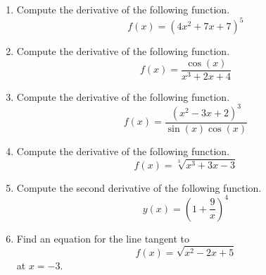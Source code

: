 \documentclass{article}
\begin{document}
\ActivityTitle[class=Calculus I, number=4, name=Differentiation II (Solutions)]

\begin{enumerate}
\item Compute the derivative of the following function. \[ f(x) = (4 x^2 + 7 x + 7)^{5} \]

  
\vspace{1cm}

\item Compute the derivative of the following function. \[ f(x) = \frac{\cos(x)}{x^3 + 2 x + 4} \]

  
\vspace{1cm}

\item Compute the derivative of the following function. \[ f(x) = \frac{(x^2 - 3 x + 2)^{3}}{\sin(x)\cos(x)} \]

  
\vspace{1cm}

\item Compute the derivative of the following function. \[ f(x) = \sqrt[3]{x^3 + 3 x - 3} \]

  
\vspace{1cm}

\item Compute the second derivative of the following function. \[ y(x) = \left( 1 + \frac{9}{x} \right)^{4} \]

  
\vspace{1cm}

\item Find an equation for the line tangent to \[ f(x) = \sqrt{x^2 - 2 x + 5} \] at $x = -3$.

  
\vspace{1cm}
\end{enumerate}
\end{document}
